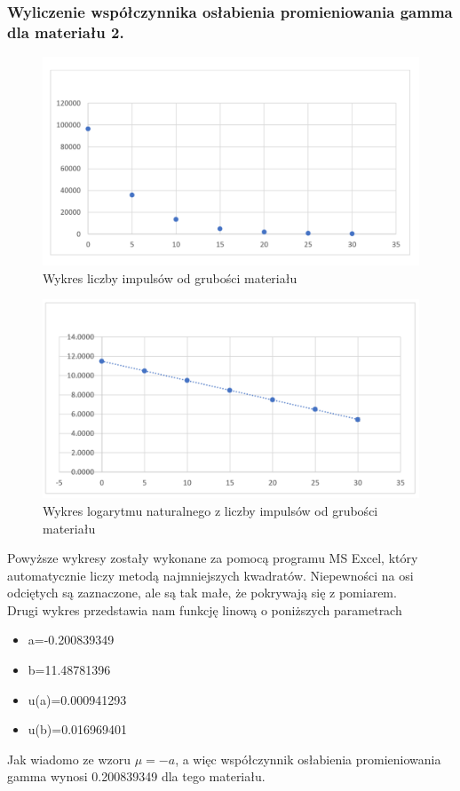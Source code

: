 \documentclass{article}
\begin{document}
\subsubsection{Wyliczenie współczynnika osłabienia promieniowania gamma dla materiału 2.}
\begin{figure}[h!]
    \centering
    \includegraphics[scale=0.55]{2.1.png}
    \caption{Wykres liczby impulsów od grubości materiału}
\end{figure}
\begin{figure}[h!]
    \centering
    \includegraphics[scale=0.55]{2.2.png}
        \caption{Wykres logarytmu naturalnego z liczby impulsów od grubości materiału}
\end{figure}
\clearpage
\noindent Powyższe wykresy zostały wykonane za pomocą programu MS Excel, który automatycznie liczy metodą najmniejszych kwadratów. Niepewności na osi odciętych są zaznaczone, ale są tak małe, że pokrywają się z pomiarem.\\
Drugi wykres przedstawia nam funkcję linową o poniższych parametrach
\begin{itemize}
    \item a=-0.200839349
    \item b=11.48781396
    \item u(a)=0.000941293
    \item u(b)=0.016969401
\end{itemize}
Jak wiadomo ze wzoru $\mu = -a $, a więc współczynnik osłabienia promieniowania gamma wynosi 0.200839349 dla tego materiału.
\end{document}
